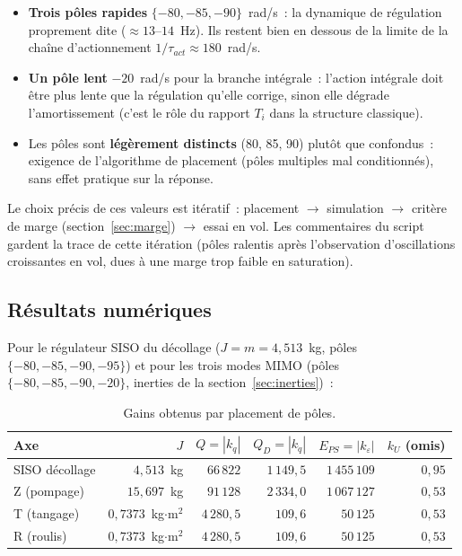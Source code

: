 \documentclass[a4paper,11pt]{article}
\begin{document}
\begin{itemize}
    \item \textbf{Trois pôles \og rapides \fg} $\{-80, -85, -90\}$~rad/s~:
          la dynamique de régulation proprement dite ($\approx 13$--$14$~Hz).
          Ils restent bien en dessous de la limite de la chaîne d'actionnement
          $1/\tau_{act} \approx 180$~rad/s.
    \item \textbf{Un pôle lent} $-20$~rad/s pour la branche intégrale~:
          l'action intégrale doit être plus lente que la régulation qu'elle
          corrige, sinon elle dégrade l'amortissement (c'est le rôle du
          rapport $T_i$ dans la structure classique).
    \item Les pôles sont \textbf{légèrement distincts} (80, 85, 90) plutôt que
          confondus~: exigence de l'algorithme de placement (pôles multiples
          mal conditionnés), sans effet pratique sur la réponse.
\end{itemize}
Le choix précis de ces valeurs est itératif~: placement $\to$ simulation
$\to$ critère de marge (section~\ref{sec:marge}) $\to$ essai en vol. Les
commentaires du script gardent la trace de cette itération (pôles ralentis
après l'observation d'oscillations croissantes en vol, dues à une marge trop
faible en saturation).

\subsection{Résultats numériques}

Pour le régulateur SISO du décollage ($J = m = 4{,}513$~kg, pôles
$\{-80,-85,-90,-95\}$) et pour les trois modes MIMO (pôles
$\{-80,-85,-90,-20\}$, inerties de la section~\ref{sec:inerties})~:

\begin{table}[h]
    \centering
    \begin{tabular}{lrrrrr}
        \toprule
        Axe & $J$ & $Q = |k_q|$ & $Q_D = |k_{\dot q}|$ & $E_{PS} = |k_\varepsilon|$ & $k_U$ (omis) \\
        \midrule
        SISO décollage & $4{,}513$~kg & $66\,822$ & $1\,149{,}5$ & $1\,455\,109$ & $0{,}95$ \\
        Z (pompage)    & $15{,}697$~kg & $91\,128$ & $2\,334{,}0$ & $1\,067\,127$ & $0{,}53$ \\
        T (tangage)    & $0{,}7373$~kg$\cdot$m$^2$ & $4\,280{,}5$ & $109{,}6$ & $50\,125$ & $0{,}53$ \\
        R (roulis)     & $0{,}7373$~kg$\cdot$m$^2$ & $4\,280{,}5$ & $109{,}6$ & $50\,125$ & $0{,}53$ \\
        \bottomrule
    \end{tabular}
    \caption{Gains obtenus par placement de pôles.}
    \label{tab:gains}
\end{table}
\end{document}
